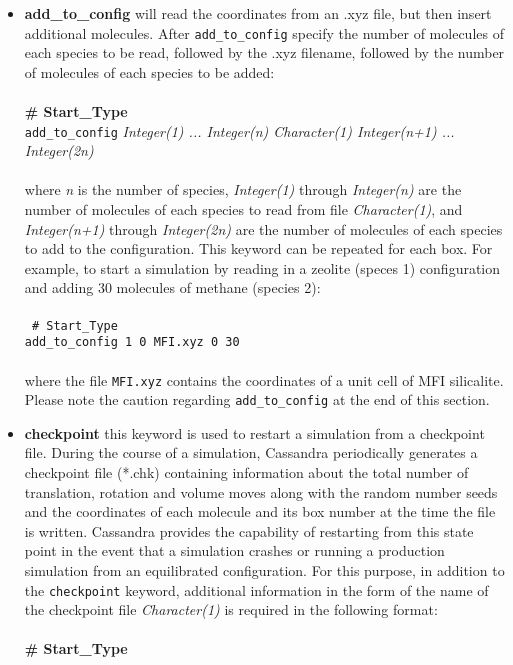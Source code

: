 \begin{itemize}
\item {\textbf{add\_to\_config}} will read the coordinates from an .xyz file, but then insert additional molecules.
After {\tt add\_to\_config} specify the number of molecules of each species to be read, followed by the .xyz filename, 
followed by the number of molecules of each species to be added: \\ \\
%
{\bf \# Start\_Type} \\
{\tt add\_to\_config} {\it Integer(1) ... Integer(n) Character(1) Integer(n+1) ... Integer(2n)}\\ \\
%
where {\it n} is the number of species, {\it Integer(1)} through {\it Integer(n)} are the number of molecules of each
species to read from file {\it Character(1)}, and {\it Integer(n+1)} through {\it Integer(2n)} are the number of molecules
of each species to add to the configuration.
This keyword can be repeated for each box.
For example, to start a simulation by reading in a zeolite (speces 1) configuration and adding 30 molecules of methane (species 2): \\ \\
%
\texttt{
\# Start\_Type \\
add\_to\_config  1  0 MFI.xyz 0 30 \\} \\
%
where the file \texttt{MFI.xyz} contains the coordinates of a unit cell of MFI silicalite. \\
%
Please note the caution regarding {\tt add\_to\_config} at the end of this section. \\
%
\item \textbf{checkpoint} this keyword is used to restart a simulation from a checkpoint file.
During the course of a simulation, Cassandra periodically generates a checkpoint file (*.chk)
 containing information about the total number of translation, rotation and volume moves along with the random number seeds and 
the coordinates of each molecule and its box number at the time the file is written. Cassandra provides
the capability of restarting from this state point in the event that a simulation crashes or 
running a production simulation from an equilibrated configuration. For this
purpose, in addition to the {\tt checkpoint} keyword, additional information in the form of the name of 
the checkpoint file {\it Character(1)} is required in the following format: \\ \\
%
{\bf \# Start\_Type} \\

\end{itemize}
